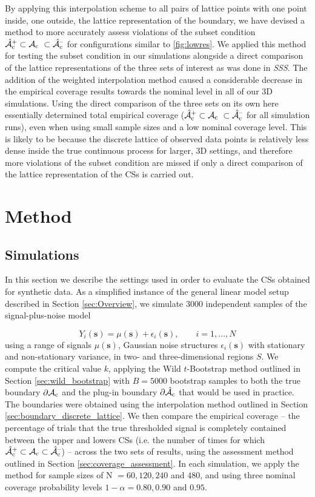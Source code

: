 By applying this interpolation scheme to all pairs of lattice points with one point inside, one outside, the lattice representation of the boundary, we have devised a method to more accurately assess violations of the subset condition $\Ahatcp \subset \Ac \ \subset \Ahatcm$ for configurations similar to \ref{fig:lowres}. We applied this method for testing the subset condition in our simulations alongside a direct comparison of the lattice representations of the three sets of interest as was done in \textit{SSS}. The addition of the weighted interpolation method caused a considerable decrease in the empirical coverage results towards the nominal level in all of our 3D simulations. Using the direct comparison of the three sets on its own here essentially determined total empirical coverage ($\Ahatcp \subset \Ac \ \subset \Ahatcm$ for all simulation runs), even when using small sample sizes and a low nominal coverage level. This is likely to be because the discrete lattice of observed data points is relatively less dense inside the true continuous process for larger, 3D settings, and therefore more violations of the subset condition are missed if only a direct comparison of the lattice representation of the CSs is carried out.

\section{Method}
\subsection{Simulations}
\label{sec:simulations}
In this section we describe the settings used in order to evaluate the CSs obtained for synthetic data. As a simplified instance of the general linear model setup described in Section \ref{sec:Overview}, we simulate 3000 independent samples of the signal-plus-noise model

$$Y_{i}(\bm{s}) = \mu(\bm{s}) + \epsilon_{i}(\bm{s}), \qquad i = 1, ..., N$$
using a range of signals $\mu(\bm{s})$, Gaussian noise structures $\epsilon_{i}(\bm{s})$ with stationary and non-stationary variance, in two- and three-dimensional regions $S$. We compute the critical value $k$, applying the Wild $t$-Bootstrap method outlined in Section \ref{sec:wild_bootstrap} with $B = 5000$ bootstrap samples to both the true boundary $\operatorname{\partial\mathcal{A}_{c}}$ and the plug-in boundary $\operatorname{\partial\hat{\mathcal{A}}_{c}}$ that would be used in practice. The boundaries were obtained using the interpolation method outlined in Section \ref{sec:boundary_discrete_lattice}. We then compare the empirical coverage -- the percentage of trials that the true thresholded signal is completely contained between the upper and lowers CSs (i.e. the number of times for which $\operatorname{\hat{\mathcal{A}}_{c}^+} \subset \operatorname{\mathcal{A}_{c}} \subset \operatorname{\hat{\mathcal{A}}_{c}^{\textrm{--}}}$) -- across the two sets of results, using the assessment method outlined in Section \ref{sec:coverage_assessment}. In each simulation, we apply the method for sample sizes of N $= 60, 120, 240$ and $480$, and using three nominal coverage probability levels $1 - \alpha = 0.80, 0.90$ and $0.95$.

